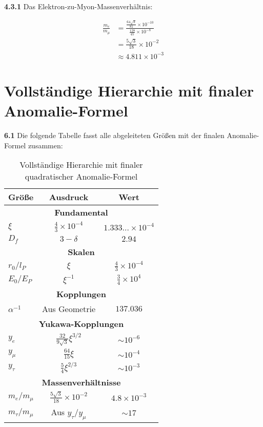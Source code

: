 \documentclass[12pt,a4paper]{article}
\newcommand{\lP}{l_P}
\newcommand{\EP}{E_P}
\newcommand{\rzero}{r_0}
\newcommand{\Ezero}{E_0}
\newcommand{\xipar}{\xi}
\begin{document}
	\noindent \textbf{4.3.1} Das Elektron-zu-Myon-Massenverhältnis:
	\begin{keyresult}
		\begin{align}
			\frac{m_e}{m_\mu} &= \frac{\frac{64 \sqrt{3}}{81} \times 10^{-10}}{\frac{128}{45} \times 10^{-8}} \\
			&= \frac{5 \sqrt{3}}{18} \times 10^{-2} \\
			&\approx 4.811 \times 10^{-3}
		\end{align}
	\end{keyresult}


	

	\section{Vollständige Hierarchie mit finaler Anomalie-Formel}
	
	\noindent \textbf{6.1} Die folgende Tabelle fasst alle abgeleiteten Größen mit der finalen Anomalie-Formel zusammen:
	
	\begin{table}[h]
		\centering
		\begin{tabular}{lcc}
			\toprule
			\textbf{Größe} & \textbf{Ausdruck} & \textbf{Wert} \\
			\midrule
			\multicolumn{3}{c}{\textbf{Fundamental}} \\
			$\xipar$ & $\frac{4}{3} \times 10^{-4}$ & $1.333\ldots \times 10^{-4}$ \\
			$D_f$ & $3 - \delta$ & $2.94$ \\
			\midrule
			\multicolumn{3}{c}{\textbf{Skalen}} \\
			$\rzero/\lP$ & $\xipar$ & $\frac{4}{3} \times 10^{-4}$ \\
			$\Ezero/\EP$ & $\xipar^{-1}$ & $\frac{3}{4} \times 10^{4}$ \\
			\midrule
			\multicolumn{3}{c}{\textbf{Kopplungen}} \\
			$\alpha^{-1}$ & Aus Geometrie & $137.036$ \\
			\midrule
			\multicolumn{3}{c}{\textbf{Yukawa-Kopplungen}} \\
			$y_e$ & $\frac{32}{9\sqrt{3}} \xipar^{3/2}$ & $\sim 10^{-6}$ \\
			$y_\mu$ & $\frac{64}{15} \xipar$ & $\sim 10^{-4}$ \\
			$y_\tau$ & $\frac{5}{4} \xipar^{2/3}$ & $\sim 10^{-3}$ \\
			\midrule
			\multicolumn{3}{c}{\textbf{Massenverhältnisse}} \\
			$m_e/m_\mu$ & $\frac{5 \sqrt{3}}{18} \times 10^{-2}$ & $4.8 \times 10^{-3}$ \\
			$m_\tau/m_\mu$ & Aus $y_\tau/y_\mu$ & $\sim 17$ \\
			\midrule

		\end{tabular}
		\caption{Vollständige Hierarchie mit finaler quadratischer Anomalie-Formel}
	\end{table}
	
\end{document}
